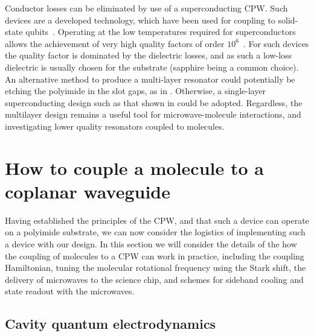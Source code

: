 Conductor losses can be eliminated by use of a superconducting CPW. Such
devices are a developed technology, which have been used for coupling to
solid-state qubits~\cite{Wallraff2004}. Operating at the low temperatures
required for superconductors allows the achievement of very high quality
factors of order $10^6$~\cite{doi:10.1063/1.3552890, Day2003}. For such devices
the quality factor is dominated by the dielectric losses, and as such a
low-loss dielectric is usually chosen for the substrate (sapphire being a
common choice). An alternative method to produce a multi-layer resonator could
potentially be etching the polyimide in the slot gaps, as in
. Otherwise, a single-layer superconducting design such as
that shown in  could be adopted. Regardless, the
multilayer design remains a useful tool for microwave-molecule interactions,
and investigating lower quality resonators coupled to molecules. 


\section{How to couple a molecule to a coplanar waveguide}
\label{mws:coupling}

Having established the principles of the CPW, and that such a device can
operate on a polyimide substrate, we can now consider the logistics of
implementing such a device with our design. In this section we will consider
the details of the how the coupling of molecules to a CPW can work in practice,
including the coupling Hamiltonian, tuning the molecular rotational frequency
using the Stark shift,  the delivery of microwaves to the science chip, and
schemes for sideband cooling and state readout with the microwaves.

\subsection{Cavity quantum electrodynamics}
\label{mws:CQED}

